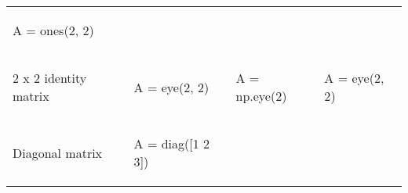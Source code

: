 \documentclass[10pt, landscape]{article}
\newenvironment{Shaded}{}{}
\newcommand{\DecValTok}[1]{\textcolor[rgb]{0.25,0.63,0.44}{{#1}}}
\newcommand{\FloatTok}[1]{\textcolor[rgb]{0.25,0.63,0.44}{{#1}}}
\newcommand{\OperatorTok}[1]{\textcolor[rgb]{0.40,0.40,0.40}{{#1}}}
\newcommand{\NormalTok}[1]{{#1}}
\begin{document}
\begin{multicols*}{2}
\begin{tabular}[ ]{@{}llll@{}}
\begin{minipage}[t]{0.20\columnwidth}
\begin{Shaded}
\begin{Highlighting}[]
\NormalTok{A = ones(}\FloatTok{2}\NormalTok{, }\FloatTok{2}\NormalTok{)}
\end{Highlighting}
\end{Shaded}
\strut
\end{minipage}\tabularnewline
\begin{minipage}[t]{0.24\columnwidth}\raggedright\strut
2 x 2 identity matrix\strut
\end{minipage} & \begin{minipage}[t]{0.20\columnwidth}\raggedright\strut
\begin{Shaded}
\begin{Highlighting}[]
\NormalTok{A = eye(}\FloatTok{2}\NormalTok{, }\FloatTok{2}\NormalTok{)}
\end{Highlighting}
\end{Shaded}
\strut
\end{minipage} & \begin{minipage}[t]{0.25\columnwidth}\raggedright\strut
\begin{Shaded}
\begin{Highlighting}[]
\NormalTok{A }\OperatorTok{=} \NormalTok{np.eye(}\DecValTok{2}\NormalTok{)}
\end{Highlighting}
\end{Shaded}
\strut
\end{minipage} & \begin{minipage}[t]{0.20\columnwidth}\raggedright\strut
\begin{Shaded}
\begin{Highlighting}[]
\NormalTok{A = eye(}\FloatTok{2}\NormalTok{, }\FloatTok{2}\NormalTok{)}
\end{Highlighting}
\end{Shaded}
\strut
\end{minipage}\tabularnewline
\begin{minipage}[t]{0.24\columnwidth}\raggedright\strut
Diagonal matrix\strut
\end{minipage} & \begin{minipage}[t]{0.20\columnwidth}\raggedright\strut
\begin{Shaded}
\begin{Highlighting}[]
\NormalTok{A = diag([}\FloatTok{1} \FloatTok{2} \FloatTok{3}\NormalTok{])}
\end{Highlighting}
\end{Shaded}
\strut
\end{minipage} & \begin{minipage}[t]{0.25\columnwidth}\raggedright\strut

\end{minipage}
\end{tabular}
\end{multicols*}
\end{document}
